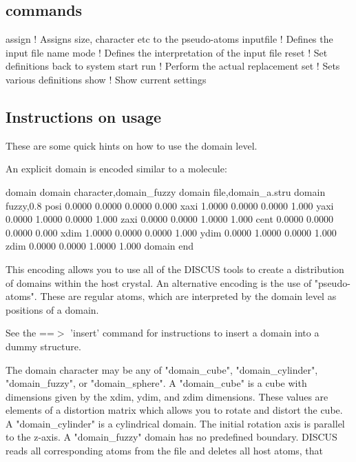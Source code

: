 \subsection*{commands}
\par
\begin{MacVerbatim}
assign     ! Assigns size, character etc to the pseudo-atoms
inputfile  ! Defines the input file name
mode       ! Defines the interpretation of the input file
reset      ! Set definitions back to system start
run        ! Perform the actual replacement
set        ! Sets various definitions
show       ! Show current settings
\end{MacVerbatim}
\subsection*{Instructions on usage}
\par
These are some quick hints on how to use the domain level. 
\par
An explicit domain is encoded similar to a molecule: 
\par
domain 
domain character,domain\_fuzzy 
domain file,domain\_a.stru 
domain fuzzy,0.8 
posi      0.0000     0.0000    0.0000  0.000 
xaxi      1.0000     0.0000    0.0000  1.000 
yaxi      0.0000     1.0000    0.0000  1.000 
zaxi      0.0000     0.0000    1.0000  1.000 
cent      0.0000     0.0000    0.0000  0.000 
xdim      1.0000     0.0000    0.0000  1.000 
ydim      0.0000     1.0000    0.0000  1.000 
zdim      0.0000     0.0000    1.0000  1.000 
domain end 
\par
This encoding allows you to use all of the DISCUS tools to create a 
distribution of domains within the host crystal. An alternative 
encoding is the use of "pseudo-atoms". These are regular atoms, which are 
interpreted by the domain level as positions of a domain. 
\par
See the ==$> $ 'insert' command for instructions to insert a domain into 
a dummy structure. 
\par
The domain character may be any of "domain\_cube", "domain\_cylinder", 
"domain\_fuzzy", or "domain\_sphere". 
A "domain\_cube" is a cube with dimensions given by the xdim, ydim, 
and zdim dimensions. These values are elements of a distortion matrix 
which allows you to rotate and distort the cube. 
A "domain\_cylinder" is a cylindrical domain. The initial rotation 
axis is parallel to the z-axis. 
A "domain\_fuzzy" domain has no predefined boundary. DISCUS reads all 
corresponding atoms from the file and deletes all host atoms, that 
